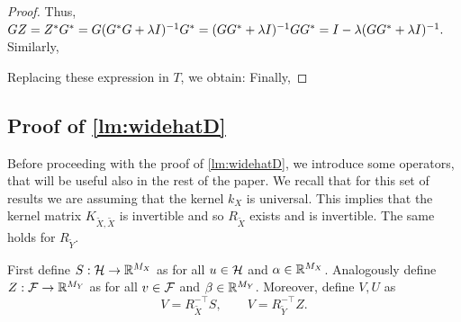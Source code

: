 \begin{proof}
Thus, $GZ = Z^*G^*= G(G^*G + \lambda I) ^{-1} G^*= (GG^* + \lambda I)^{-1}GG^* = I - \lambda (GG^* + \lambda I)^{-1}.$ Similarly,

Replacing these expression in $T$, we obtain:
Finally,
\end{proof}



\subsection{Proof of \cref{lm:widehatD}}


Before proceeding with the proof of \cref{lm:widehatD}, we introduce some operators, that will be useful also in the rest of the paper. We recall that for this set of results we are assuming that the kernel $k_X$ is universal. This implies that the kernel matrix $K_{\tilde{X},\tilde{X}}$ is invertible and so $R_{\tilde{X}}$ exists and is invertible. The same holds for $R_{\tilde Y}$.

\begin{definition}\label{def:operators}
First define $S:\mathcal H \to \mathbb R^{M_X}$ as
for all $u \in \mathcal H$ and $\alpha \in \mathbb R^{M_X}$.
Analogously define $Z:{\cal F} \to \mathbb R^{M_Y}$ as
for all $v \in {\cal F}$ and $\beta \in \mathbb R^{M_Y}$.
Moreover, define $V, U$ as
$$V = R^{-\top}_{\tilde X} S, \qquad V = R^{-\top}_{\tilde Y} Z.$$
\end{definition}

